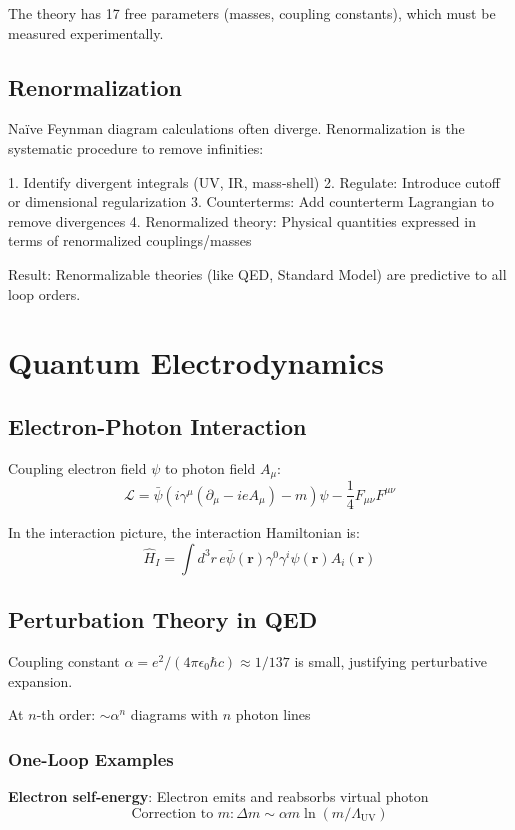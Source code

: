 \documentclass[12pt,openany,oneside]{book}
\begin{document}
{{{The theory has 17 free parameters (masses, coupling constants), which must be measured experimentally.

\section{Renormalization}

Naïve Feynman diagram calculations often diverge. Renormalization is the systematic procedure to remove infinities:

1. Identify divergent integrals (UV, IR, mass-shell)
2. Regulate: Introduce cutoff or dimensional regularization
3. Counterterms: Add counterterm Lagrangian to remove divergences
4. Renormalized theory: Physical quantities expressed in terms of renormalized couplings/masses

Result: Renormalizable theories (like QED, Standard Model) are predictive to all loop orders.

\chapter{Quantum Electrodynamics}

\section{Electron-Photon Interaction}

Coupling electron field $\psi$ to photon field $A_\mu$:
\[
\mathcal{L} = \bar{\psi}(i\gamma^\mu(\partial_\mu - ieA_\mu) - m)\psi - \frac{1}{4}F_{\mu\nu}F^{\mu\nu}
\]

In the interaction picture, the interaction Hamiltonian is:
\[
\hat{H}_I = \int d^3r \, e\bar{\psi}(\mathbf{r})\gamma^0\gamma^i\psi(\mathbf{r})A_i(\mathbf{r})
\]

\section{Perturbation Theory in QED}

Coupling constant $\alpha = e^2/(4\pi\epsilon_0\hbar c) \approx 1/137$ is small, justifying perturbative expansion.

At $n$-th order: $\sim \alpha^n$ diagrams with $n$ photon lines

\subsection{One-Loop Examples}

\textbf{Electron self-energy}: Electron emits and reabsorbs virtual photon
\[
\text{Correction to } m: \Delta m \sim \alpha m \ln(m/\Lambda_\text{UV})
\]

}}}
\end{document}
